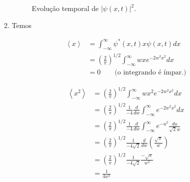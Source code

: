 \documentclass[a4paper, 12pt, notitlepage]{article}
\begin{document}
\begin{enumerate}
\begin{enumerate}
  \begin{figure}[!h]  
    \begin{minipage}[l]{0.32\linewidth}
    \centering
    \end{minipage}
    \begin{minipage}[c]{0.32\linewidth}
    \centering
    \end{minipage}
    \begin{minipage}[r]{0.32\linewidth}
    \centering
    \end{minipage}
    \caption{Evolução temporal de $|\psi(x,t)|^2$.}
    \label{fig:comp.I.aumento}
  \end{figure}
  
  \item Temos
  
  \begin{align*}
  \left\langle x \right\rangle &= \int_{-\infty}^{\infty} \psi^{\ast}(x,t) x \psi(x,t) dx \\
  &= \left(\frac{2}{\pi}\right)^{1/2} \int_{-\infty}^{\infty} wxe^{-2w^2 x^2} dx \\
  &= 0 \qquad \text{(o integrando é ímpar.)}
  \end{align*}
  
  \begin{align*}
  \left\langle x^2 \right\rangle &= \left(\frac{2}{\pi}\right)^{1/2} \int_{-\infty}^{\infty} wx^2 e^{-2w^2x^2} dx \\
  &= \left(\frac{2}{\pi}\right)^{1/2} \frac{1}{-4}\frac{d}{dw} \int_{-\infty}^{\infty}  e^{-2w^2x^2} dx \\
  &= \left(\frac{2}{\pi}\right)^{1/2} \frac{1}{-4}\frac{d}{dw} \int_{-\infty}^{\infty}  e^{-u^2} \frac{du}{\sqrt{2}w} \\
  &= \left(\frac{2}{\pi}\right)^{1/2} \frac{1}{-4\sqrt{2}}\frac{d}{dw} \left(\frac{\sqrt{\pi}}{w}\right) \\
  &= \left(\frac{2}{\pi}\right)^{1/2} \frac{1}{-4\sqrt{2}}\frac{-\sqrt{\pi}}{w^2} \\
  &= \frac{1}{4w^2}
  \end{align*}
  

\end{enumerate}
\end{enumerate}
\end{document}
